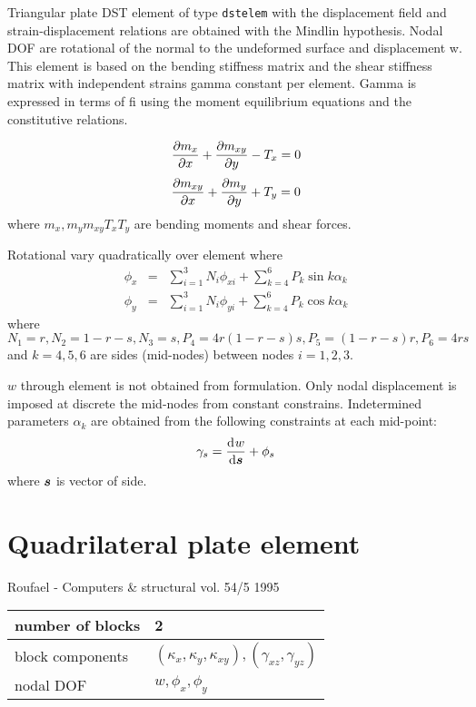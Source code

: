 Triangular plate DST element of type {\tt dstelem} with the displacement field and strain-displacement relations 
are obtained with the Mindlin hypothesis. Nodal DOF are rotational of the normal to the  undeformed surface and displacement w. 
This element is based on the bending stiffness matrix and the shear stiffness matrix with independent strains gamma 
constant per element. Gamma is expressed in terms of fi using the moment equilibrium equations and the constitutive relations.

\begin{equation}
\mbox{$\displaystyle\frac{\partial{m_x}}{\partial{x}}$} + \mbox{$\displaystyle\frac{\partial{m_{xy}}}{\partial{y}}$} - T_x = 0
\end{equation}
\begin{equation}
\mbox{$\displaystyle\frac{\partial{m_{xy}}}{\partial{x}}$} + \mbox{$\displaystyle\frac{\partial{m_y}}{\partial{y}}$} + T_y = 0
\end{equation}
where $m_x, m_y m_{xy} T_x T_y$ are bending moments and shear forces.

Rotational vary quadratically over element where 
\begin{eqnarray}
\phi_x &=& \sum_{i=1}^{3} N_i\phi_{xi}+\sum_{k=4}^{6} P_k\sin{k}\alpha_{k}\\
\phi_y &=& \sum_{i=1}^{3} N_i\phi_{yi}+\sum_{k=4}^{6} P_k\cos{k}\alpha_{k}
\end{eqnarray}
where $N_1=r, N_2=1-r-s, N_3=s, P_4=4r(1-r-s)s, P_5=(1-r-s)r, P_6=4rs$
and $k=4,5,6 $ are sides (mid-nodes) between nodes $i=1,2,3$.


$w$ through element is not obtained from formulation. Only nodal displacement is imposed at discrete the mid-nodes from 
constant constrains.
Indetermined parameters $\alpha_{k}$ are obtained from the following constraints at each mid-point:
\begin{equation}
\gamma_s = \mbox{$\displaystyle\frac{{\rm d}\>\!{w}}{{\rm d}{\mbox{\boldmath$s$}}}$} + \phi_{s}
\end{equation}
where $\mbox{\boldmath$s$}$ is vector of side.




\section{Quadrilateral plate element}
  Roufael - Computers \& structural vol. 54/5 1995
\label{sectq4elem}

\begin{tabular}{|l|l|}
\hline
number of blocks & 2
\\ \hline
block components & $(\kappa_x,\kappa_y,\kappa_{xy}),(\gamma_{xz},\gamma_{yz})$
\\ \hline
nodal DOF & $w,\phi_x,\phi_y$
\\ \hline
\end{tabular}

